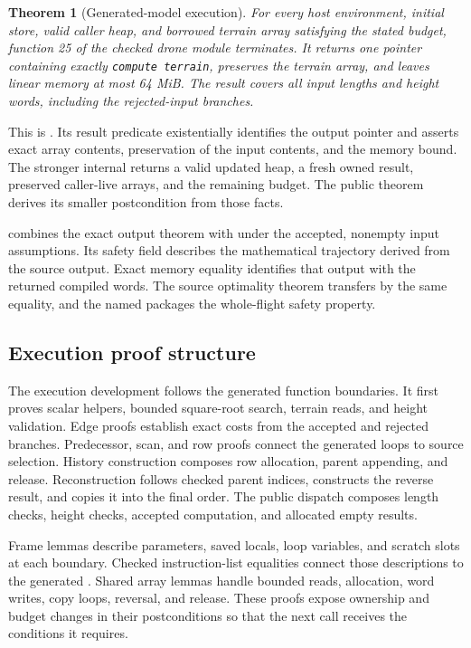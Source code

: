 \documentclass[11pt]{article}
\newtheorem{theorem}{Theorem}
\begin{document}
\begin{theorem}[Generated-model execution]
For every host environment, initial store, valid caller heap, and borrowed terrain array satisfying the stated budget, function 25 of the checked drone module terminates.  It returns one pointer containing exactly \textup{\texttt{compute terrain}}, preserves the terrain array, and leaves linear memory at most 64 MiB.  The result covers all input lengths and height words, including the rejected-input branches.
\end{theorem}

This is .  Its result predicate  existentially identifies the output pointer and asserts exact array contents, preservation of the input contents, and the memory bound.  The stronger internal  returns a valid updated heap, a fresh owned result, preserved caller-live arrays, and the remaining budget.  The public theorem derives its smaller postcondition from those facts.

 combines the exact output theorem with  under the accepted, nonempty input assumptions.  Its safety field describes the mathematical trajectory derived from the source output.  Exact memory equality identifies that output with the returned compiled words.  The source optimality theorem transfers by the same equality, and the named  packages the whole-flight safety property.

\subsection{Execution proof structure}

The execution development follows the generated function boundaries.  It first proves scalar helpers, bounded square-root search, terrain reads, and height validation.  Edge proofs establish exact costs from the accepted and rejected branches.  Predecessor, scan, and row proofs connect the generated loops to source selection.  History construction composes row allocation, parent appending, and release.  Reconstruction follows checked parent indices, constructs the reverse result, and copies it into the final order.  The public dispatch composes length checks, height checks, accepted computation, and allocated empty results.

Frame lemmas describe parameters, saved locals, loop variables, and scratch slots at each boundary.  Checked instruction-list equalities connect those descriptions to the generated .  Shared array lemmas handle bounded reads, allocation, word writes, copy loops, reversal, and release.  These proofs expose ownership and budget changes in their postconditions so that the next call receives the conditions it requires.
\end{document}
